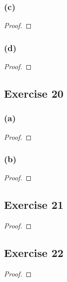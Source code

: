 \documentclass[14pt]{extarticle}
\begin{document}
\subsubsection{(c)}

\begin{proof}

\end{proof}

\subsubsection{(d)}

\begin{proof}

\end{proof}

\subsection{Exercise 20}

\subsubsection{(a)}

\begin{proof}

\end{proof}

\subsubsection{(b)}

\begin{proof}

\end{proof}

\subsection{Exercise 21}

\begin{proof}

\end{proof}

\subsection{Exercise 22}

\begin{proof}

\end{proof}
\end{document}
